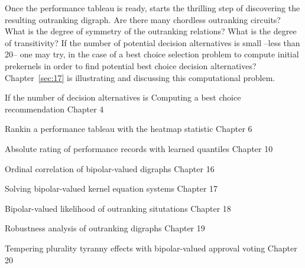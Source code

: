 Once the performance tableau is ready, starts the thrilling step of discovering the resulting outranking digraph. Are there many chordless outranking circuits? What is the degree of symmetry of the outranking relations? What is the degree of transitivity?  If the number of potential decision alternatives is small --less than 20-- one may try, in the case of a best choice selection problem to compute initial prekernels in order to find potential best choice decision alternatives? Chapter~\ref{sec:17} is illustrating and discussing this computational problem.  



If the number of decision alternatives is 
Computing a \Rubis best choice recommendation Chapter 4

Rankin a performance tableau with the heatmap statistic Chapter 6

Absolute rating of performance records with learned quantiles Chapter 10

Ordinal correlation of bipolar-valued digraphs Chapter 16

Solving bipolar-valued \Berge kernel equation systems Chapter 17

Bipolar-valued likelihood of outranking situtations Chapter 18

Robustness analysis of outranking digraphs Chapter 19

Tempering plurality tyranny effects with bipolar-valued approval voting Chapter 20

\clearpage


